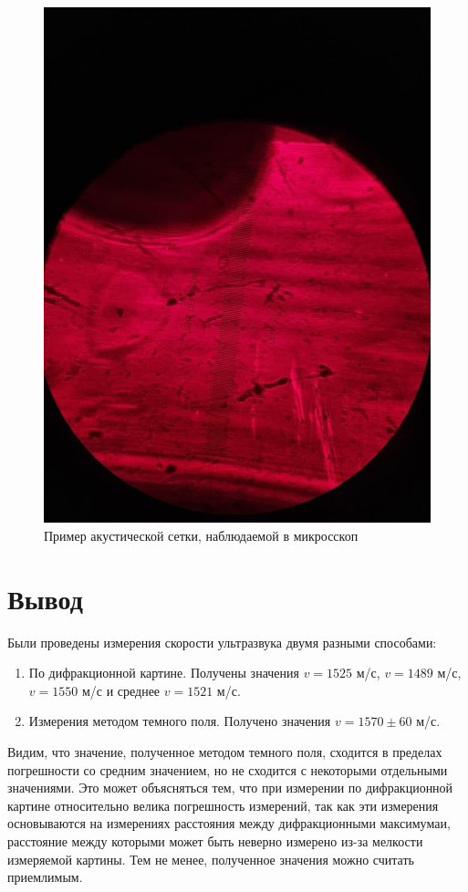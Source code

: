 \documentclass[a4paper,12pt]{article}
\begin{document}
\begin{figure}[H]
    \centering
    \includegraphics[scale=0.3]{image.png}
    \caption{Пример акустической сетки, наблюдаемой в микросскоп}
\end{figure}

\section*{Вывод}
Были проведены измерения скорости ультразвука двумя разными способами:
\begin{enumerate}
    \item По дифракционной картине. Получены значения $v = 1525$ м/с, $v = 1489$ м/с, $v = 1550$ м/с и среднее $v = 1521$ м/с.
    \item Измерения методом темного поля. Получено значения $v = 1570 \pm 60$ м/с.
\end{enumerate}
Видим, что значение, полученное методом темного поля, сходится в пределах погрешности со средним значением, но не сходится с некоторыми отдельными значениями. Это может объясняться тем, что при измерении по дифракционной картине относительно велика погрешность измерений, так как эти измерения основываются на измерениях расстояния между дифракционными максимумаи, расстояние между которыми может быть неверно измерено из-за мелкости измеряемой картины. Тем не менее, полученное значения можно считать приемлимым.
\end{document}
